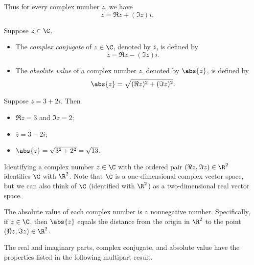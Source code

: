 Thus for every complex number $z$, we have
\[ z = \Re z + (\Im z)i. \]

\begin{definition}\label{ax:4.2}
Suppose $z\in\C$.
\begin{itemize}
\item The \emph{complex conjugate} of $z\in\C$, denoted by $\overline{z}$, is
  defined by
  \[ \overline{z} = \Re z - (\Im z)i. \]
\item The \emph{absolute value} of a complex number $z$, denoted by $\abs{z}$,
  is defined by
  \[ \abs{z} = \sqrt{(\Re z)^2+(\Im z)^2}. \]
\end{itemize}
\end{definition}

\begin{example}\label{ax:4.3}
Suppose $z=3+2i$. Then
\begin{itemize}
\item $\Re z=3$ and $\Im z=2$;
\item $\overline{z}=3-2i$;
\item $\abs{z}=\sqrt{3^2+2^2}=\sqrt{13}$.
\end{itemize}
\end{example}

Identifying a complex number $z\in\C$ with the ordered pair
$(\Re z,\Im z)\in\R^2$ identifies $\C$ with $\R^2$. Note that $\C$ is a
one-dimensional complex vector space, but we can also think of $\C$
(identified with $\R^2$) as a two-dimensional real vector space.

The absolute value of each complex number is a nonnegative number.
Specifically, if $z\in\C$, then $\abs{z}$ equals the distance from the origin in
$\R^2$ to the point $(\Re z,\Im z)\in\R^2$.

%
The real and imaginary parts, complex conjugate, and absolute value have the
properties listed in the following multipart result.

